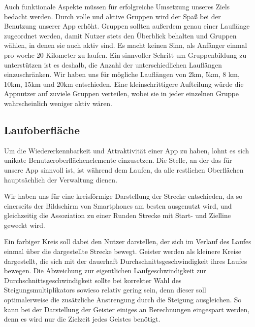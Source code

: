 Auch funktionale Aspekte müssen für erfolgreiche Umsetzung unseres Ziels bedacht werden. Durch volle und aktive Gruppen wird der Spaß bei der Benutzung unserer App erhöht. Gruppen sollten außerdem genau einer Lauflänge zugeordnet werden, damit Nutzer stets den Überblick behalten und Gruppen wählen, in denen sie auch aktiv sind. Es macht keinen Sinn, als Anfänger einmal pro woche 20 Kilometer zu laufen. Ein sinnvoller Schritt um Gruppenbildung zu unterstützen ist es deshalb, die Anzahl der unterschiedlichen Lauflängen einzuschränken. Wir haben uns für mögliche Lauflängen von 2km, 5km, 8 km, 10km, 15km und 20km entschieden. Eine kleinschrittigere Aufteilung würde die Appnutzer auf zuviele Gruppen verteilen, wobei sie in jeder einzelnen Gruppe wahrscheinlich weniger aktiv wären.
\subsection{Laufoberfläche}
Um die Wiedererkennbarkeit und Attraktivität einer App zu haben, lohnt es sich unikate Benutzeroberflächenelemente einzusetzen. Die Stelle, an der das für unsere App sinnvoll ist, ist während dem Laufen, da alle restlichen Oberflächen hauptsächlich der Verwaltung dienen.

Wir haben uns für eine kreisförmige Darstellung der Strecke entschieden, da so einerseits der Bildschirm von Smartphones am besten ausgenutzt wird, und gleichzeitig die Assoziation zu einer Runden Strecke mit Start- und Zielline geweckt wird.

Ein farbiger Kreis soll dabei den Nutzer darstellen, der sich im Verlauf des Laufes einmal über die dargestellte Strecke bewegt. Geister werden als kleinere Kreise dargestellt, die sich mit der dauerhaft Durchschnittsgeschwindigkeit ihres Laufes bewegen. Die Abweichung zur eigentlichen Laufgeschwindigkeit zur Durchschnittsgeschwindigkeit sollte bei korrekter Wahl des Steigungsmultiplikators sowieso relativ gering sein, denn dieser soll optimalerweise die zusätzliche Anstrengung durch die Steigung ausgleichen. So kann bei der Darstellung der Geister einiges an Berechnungen eingespart werden, denn es wird nur die Zielzeit jedes Geistes benötigt.

